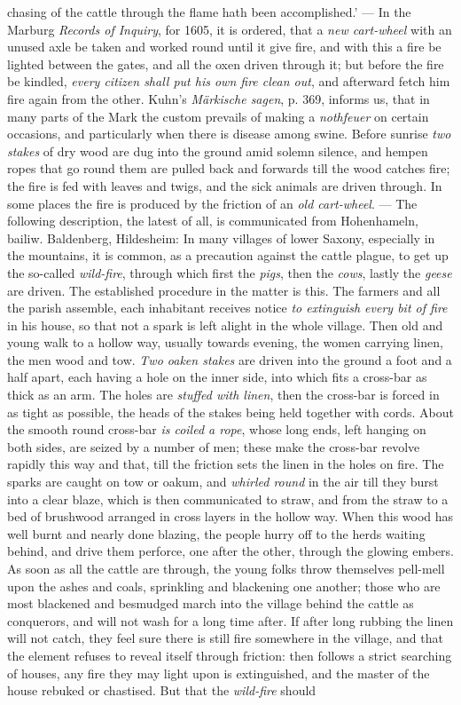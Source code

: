 \documentclass[a4paper, 11pt, oneside, polutonikogreek, english]{article}
\begin{document}
chasing of the cattle through the flame hath been accomplished.' --- In the Marburg \emph{Records of Inquiry}, for 1605, it is ordered, that a \emph{new cart-wheel} with an unused axle be taken and worked round until it give fire, and with this a fire be lighted between the gates, and all the oxen driven through it; but before the fire be kindled, \emph{every citizen shall put his own fire clean out}, and afterward fetch him fire again from the other. Kuhn's \emph{Märkische sagen}, p. 369, informs us, that in many parts of the Mark the custom prevails of making a \emph{nothfeuer} on certain occasions, and particularly when there is disease among swine. Before sunrise \emph{two stakes} of dry wood are dug into the ground amid solemn silence, and hempen ropes that go round them are pulled back and forwards till the wood catches fire; the fire is fed with leaves and twigs, and the sick animals are driven through. In some places the fire is produced by the friction of an \emph{old cart-wheel}. --- The following description, the latest of all, is communicated from Hohenhameln, bailiw. Baldenberg, Hildesheim: In many villages of lower Saxony, especially in the mountains, it is common, as a precaution against the cattle plague, to get up the so-called \emph{wild-fire}, through which first the \emph{pigs}, then the \emph{cows}, lastly the \emph{geese} are driven. The established procedure in the matter is this. The farmers and all the parish assemble, each inhabitant receives notice \emph{to extinguish every bit of fire} in his house, so that not a spark is left alight in the whole village. Then old and young walk to a hollow way, usually towards evening, the women carrying linen, the men wood and tow. \emph{Two oaken stakes} are driven into the ground a foot and a half apart, each having a hole on the inner side, into which fits a cross-bar as thick as an arm. The holes are \emph{stuffed with linen}, then the cross-bar is forced in as tight as possible, the heads of the stakes being held together with cords. About the smooth round cross-bar \emph{is coiled a rope}, whose long ends, left hanging on both sides, are seized by a number of men; these make the cross-bar revolve rapidly this way and that, till the friction sets the linen in the holes on fire. The sparks are caught on tow or oakum, and \emph{whirled round} in the air till they burst into a clear blaze, which is then communicated to straw, and from the straw to a bed of brushwood arranged in cross layers in the hollow way. When this wood has well burnt and nearly done blazing, the people hurry off to the herds waiting behind, and drive them perforce, one after the other, through the glowing embers. As soon as all the cattle are through, the young folks throw themselves pell-mell upon the ashes and coals, sprinkling and blackening one another; those who are most blackened and besmudged march into the village behind the cattle as conquerors, and will not wash for a long time after. If after long rubbing the linen will not catch, they feel sure there is still fire somewhere in the village, and that the element refuses to reveal itself through friction: then follows a strict searching of houses, any fire they may light upon is extinguished, and the master of the house rebuked or chastised. But that the \emph{wild-fire} should 
\end{document}

